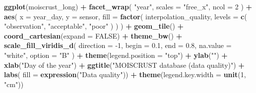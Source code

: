 \documentclass[]{article}
\newenvironment{Shaded}{\begin{snugshade}}{\end{snugshade}}
\newcommand{\DataTypeTok}[1]{\textcolor[rgb]{0.13,0.29,0.53}{#1}}
\newcommand{\DecValTok}[1]{\textcolor[rgb]{0.00,0.00,0.81}{#1}}
\newcommand{\FloatTok}[1]{\textcolor[rgb]{0.00,0.00,0.81}{#1}}
\newcommand{\KeywordTok}[1]{\textcolor[rgb]{0.13,0.29,0.53}{\textbf{#1}}}
\newcommand{\NormalTok}[1]{#1}
\newcommand{\OperatorTok}[1]{\textcolor[rgb]{0.81,0.36,0.00}{\textbf{#1}}}
\newcommand{\OtherTok}[1]{\textcolor[rgb]{0.56,0.35,0.01}{#1}}
\newcommand{\StringTok}[1]{\textcolor[rgb]{0.31,0.60,0.02}{#1}}
\begin{document}
\begin{Shaded}
\begin{Highlighting}[]
\KeywordTok{ggplot}\NormalTok{(moiscrust_long) }\OperatorTok{+}\StringTok{ }
\StringTok{  }\KeywordTok{facet_wrap}\NormalTok{(}
    \StringTok{"year"}\NormalTok{, }
    \DataTypeTok{scales =} \StringTok{"free_x"}\NormalTok{, }
    \DataTypeTok{ncol =} \DecValTok{2}
\NormalTok{    ) }\OperatorTok{+}
\StringTok{  }\KeywordTok{aes}\NormalTok{(}
    \DataTypeTok{x =}\NormalTok{ year_day, }
    \DataTypeTok{y =}\NormalTok{ sensor, }
    \DataTypeTok{fill =} \KeywordTok{factor}\NormalTok{(}
\NormalTok{      interpolation_quality, }
      \DataTypeTok{levels =} \KeywordTok{c}\NormalTok{(}
        \StringTok{"observation"}\NormalTok{, }
        \StringTok{"acceptable"}\NormalTok{, }
        \StringTok{"poor"}
\NormalTok{        )}
\NormalTok{      )}
\NormalTok{    ) }\OperatorTok{+}\StringTok{ }
\StringTok{  }\KeywordTok{geom_tile}\NormalTok{() }\OperatorTok{+}\StringTok{ }
\StringTok{  }\KeywordTok{coord_cartesian}\NormalTok{(}\DataTypeTok{expand =} \OtherTok{FALSE}\NormalTok{) }\OperatorTok{+}
\StringTok{  }\KeywordTok{theme_bw}\NormalTok{() }\OperatorTok{+}\StringTok{ }
\StringTok{  }\KeywordTok{scale_fill_viridis_d}\NormalTok{(}
    \DataTypeTok{direction =} \DecValTok{-1}\NormalTok{, }
    \DataTypeTok{begin =} \FloatTok{0.1}\NormalTok{,}
    \DataTypeTok{end =} \FloatTok{0.8}\NormalTok{, }
    \DataTypeTok{na.value =} \StringTok{"white"}\NormalTok{, }
    \DataTypeTok{option =} \StringTok{"B"}
\NormalTok{    ) }\OperatorTok{+}
\StringTok{  }\KeywordTok{theme}\NormalTok{(}\DataTypeTok{legend.position =} \StringTok{"top"}\NormalTok{) }\OperatorTok{+}\StringTok{ }
\StringTok{  }\KeywordTok{ylab}\NormalTok{(}\StringTok{""}\NormalTok{) }\OperatorTok{+}\StringTok{ }
\StringTok{  }\KeywordTok{xlab}\NormalTok{(}\StringTok{"Day of the year"}\NormalTok{) }\OperatorTok{+}
\StringTok{  }\KeywordTok{ggtitle}\NormalTok{(}\StringTok{"MOISCRUST database (data quality)"}\NormalTok{) }\OperatorTok{+}
\StringTok{  }\KeywordTok{labs}\NormalTok{(}
    \DataTypeTok{fill =} \KeywordTok{expression}\NormalTok{(}\StringTok{"Data quality"}\NormalTok{)) }\OperatorTok{+}\StringTok{ }
\StringTok{  }\KeywordTok{theme}\NormalTok{(}\DataTypeTok{legend.key.width =} \KeywordTok{unit}\NormalTok{(}\DecValTok{1}\NormalTok{, }\StringTok{"cm"}\NormalTok{))}
\end{Highlighting}
\end{Shaded}
\end{document}
